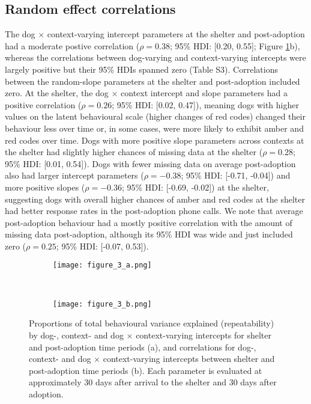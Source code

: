 \documentclass[12pt]{article}
\begin{document}
\subsection{Random effect correlations}
The dog $\times$ context-varying intercept parameters at the shelter and post-adoption had a moderate postive correlation ($\rho = 0.38$; 95\% HDI: [0.20, 0.55]; Figure \ref{fig_corrs_rept}b), whereas the correlations between dog-varying and context-varying intercepts were largely positive but their 95\% HDIs spanned zero (Table S3). Correlations between the random-slope parameters at the shelter and post-adoption included zero. At the shelter, the dog $\times$ context intercept and slope parameters had a positive correlation ($\rho = 0.26$; 95\% HDI: [0.02, 0.47]), meaning dogs with higher values on the latent behavioural scale (higher changes of red codes) changed their behaviour less over time or, in some cases, were more likely to exhibit amber and red codes over time. Dogs with more positive slope parameters across contexts at the shelter had slightly higher chances of missing data at the shelter ($\rho = 0.28$; 95\% HDI: [0.01, 0.54]). Dogs with fewer missing data on average post-adoption also had larger intercept parameters ($\rho = -0.38$; 95\% HDI: [-0.71, -0.04]) and more positive slopes ($\rho = -0.36$; 95\% HDI: [-0.69, -0.02]) at the shelter, suggesting dogs with overall higher chances of amber and red codes at the shelter had better response rates in the post-adoption phone calls. We note that average post-adoption behaviour had a mostly positive correlation with the amount of missing data post-adoption, although its 95\% HDI was wide and just included zero ($\rho = 0.25$; 95\% HDI: [-0.07, 0.53]).

\begin{figure}[t!]
  \centering
  \begin{subfigure}{0.5\textwidth}
    \centering
    \texttt{[image: figure\_3\_a.png]}
  \end{subfigure}%
  ~
  \begin{subfigure}{0.5\textwidth}
    \centering
    \texttt{[image: figure\_3\_b.png]}
  \end{subfigure}
  \caption{Proportions of total behavioural variance explained (repeatability) by dog-, context- and dog $\times$ context-varying intercepts for shelter and post-adoption time periods (a), and correlations for dog-, context- and dog $\times$ context-varying intercepts between shelter and post-adoption time periods (b). Each parameter is evaluated at approximately 30 days after arrival to the shelter and 30 days after adoption.}
  \label{fig_corrs_rept}
\end{figure}
\end{document}
